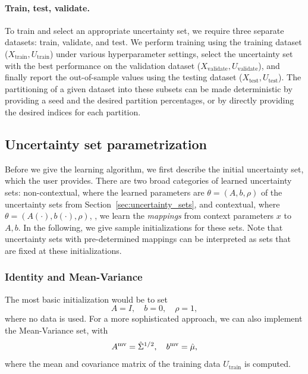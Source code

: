 \paragraph{Train, test, validate.}
To train and select an appropriate uncertainty set, we require three separate datasets: train, validate, and test. We perform training using the training dataset ($X_{\text{train}},U_{\text{train}}$) under various hyperparameter settings, select the uncertainty set with the best performance on the validation dataset ($X_{\text{validate}},U_{\text{validate}}$), and finally report the out-of-sample values using the testing dataset ($X_{\text{test}},U_{\text{test}}$). The partitioning of a given dataset into these subsets can be made deterministic by providing a seed and the desired partition percentages, or by directly providing the desired indices for each partition.  
 
\subsection{Uncertainty set parametrization}
\label{sec:set_param}
Before we give the learning algorithm, we first describe the initial uncertainty set, which the user provides.  
There are two broad categories of learned uncertainty sets: non-contextual, where the learned parameters are $\theta = (A,b,\rho)$ of the uncertainty sets from Section~\ref{sec:uncertainty_sets}, and contextual, where $\theta = (A(\cdot), b(\cdot),\rho)$, \ie, we learn the {\it mappings} from context parameters $x$ to $A,b$. 
In the following, we give sample initializations for these sets. Note that uncertainty sets with pre-determined mappings can be interpreted as sets that are fixed at these initializations. 

\subsubsection{Identity and Mean-Variance}
The most basic initialization would be to set 
$$A = I,\quad b = 0, \quad \rho = 1,$$
where no data is used. For a more sophisticated approach, we can also implement the Mean-Variance set, with
$$ A^{\rm mv}= \hat{\Sigma}^{1/2},\quad b^{\rm mv} = \hat{\mu},$$
where the mean and covariance matrix of the training data $U_{\text{train}}$ is computed. 


